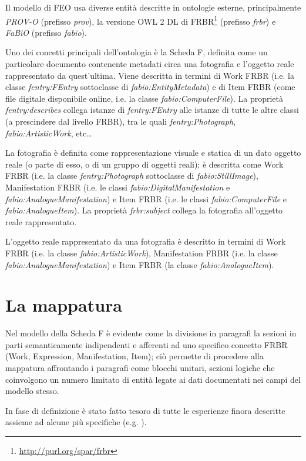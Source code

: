 Il modello di FEO usa diverse entità descritte in ontologie esterne, principalmente \emph{PROV-O} \cite{22} (prefisso \emph{prov}), la versione OWL 2 DL di FRBR\footnote{\url{http://purl.org/spar/frbr}} (prefisso \emph{frbr}) e \emph{FaBiO} \cite{6} (prefisso \emph{fabio}).

Uno dei concetti principali dell'ontologia è la Scheda F, definita come un particolare documento contenente metadati circa una fotografia e l'oggetto reale rappresentato da quest'ultima. Viene descritta in termini di Work FRBR (i.e. la classe \emph{fentry:FEntry} sottoclasse di \emph{fabio:EntityMetadata}) e di Item FRBR (come file digitale disponibile online, i.e. la classe \emph{fabio:ComputerFile}). La proprietà \emph{fentry:describes} collega istanze di \emph{fentry:FEntry} alle istanze di tutte le altre classi (a prescindere dal livello FRBR), tra le quali \emph{fentry:Photograph}, \emph{fabio:ArtisticWork}, etc\ldots

La fotografia è definita come rappresentazione visuale e statica di un dato oggetto reale (o parte di esso, o di un gruppo di oggetti reali); è descritta come Work FRBR (i.e. la classe \emph{fentry:Photograph} sottoclasse di \emph{fabio:StillImage}), Manifestation FRBR (i.e. le classi \emph{fabio:DigitalManifestation} e \emph{fabio:AnalogueManifestation}) e Item FRBR (i.e. le classi \emph{fabio:ComputerFile} e \emph{fabio:AnalogueItem}). La proprietà \emph{frbr:subject} collega la fotografia all'oggetto reale rappresentato.

L'oggetto reale rappresentato da una fotografia è descritto in termini di Work FRBR (i.e. la classe \emph{fabio:ArtisticWork}), Manifestation FRBR (i.e. la classe \emph{fabio:AnalogueManifestation}) e Item FRBR (la classe \emph{fabio:AnalogueItem}).

\section{La mappatura}
Nel modello della Scheda F è evidente come la divisione in paragrafi la sezioni in parti semanticamente indipendenti e afferenti ad uno specifico concetto FRBR (Work, Expression, Manifestation, Item); ciò permette di procedere alla mappatura affrontando i paragrafi come blocchi unitari, sezioni logiche che coinvolgono un numero limitato di entità legate ai dati documentati nei campi del modello stesso.

In fase di definizione è stato fatto tesoro di tutte le esperienze finora descritte assieme ad alcune più specifiche (e.g. \cite{12}).

